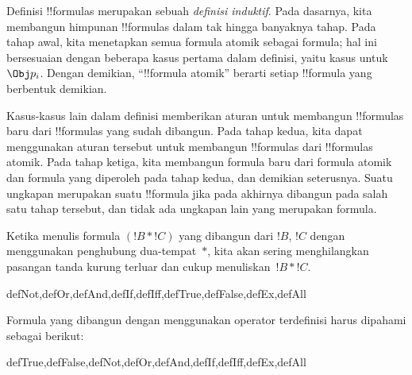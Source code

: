 \documentclass[../../../include/open-logic-section]{subfiles}
\begin{document}
\begin{explain}
Definisi !!{formula}s merupakan sebuah \emph{definisi induktif}. Pada
dasarnya, kita membangun himpunan !!{formula}s dalam tak hingga banyaknya
tahap. Pada tahap awal, kita menetapkan semua formula atomik sebagai formula;
hal ini bersesuaian dengan beberapa kasus pertama dalam definisi, yaitu kasus
untuk
%
%
$\Obj p_i$. Dengan demikian, ``!!{formula} atomik'' berarti setiap
!!{formula} yang berbentuk demikian.

Kasus-kasus lain dalam definisi memberikan aturan untuk membangun
!!{formula}s baru dari !!{formula}s yang sudah dibangun. Pada tahap kedua,
kita dapat menggunakan aturan tersebut untuk membangun !!{formula}s dari
!!{formula}s atomik. Pada tahap ketiga, kita membangun formula baru dari
formula atomik dan formula yang diperoleh pada tahap kedua, dan demikian
seterusnya. Suatu ungkapan merupakan suatu !!{formula} jika pada akhirnya dibangun
pada salah satu tahap tersebut, dan tidak ada ungkapan lain yang merupakan
formula.
\end{explain}

Ketika menulis formula $(!B \ast !C)$ yang dibangun dari $!B$, $!C$ dengan
menggunakan penghubung dua-tempat~$\ast$, kita akan sering menghilangkan
pasangan tanda kurung terluar dan cukup menuliskan~$!B \ast !C$.

\begin{tagblock}{defNot,defOr,defAnd,defIf,defIff,defTrue,defFalse,defEx,defAll}
\begin{defn}
Formula yang dibangun dengan menggunakan operator terdefinisi harus dipahami
sebagai berikut:

\begin{tagenumerate}{defTrue,defFalse,defNot,defOr,defAnd,defIf,defIff,defEx,defAll}







\end{tagenumerate}
\end{defn}
\end{tagblock}
\end{document}
